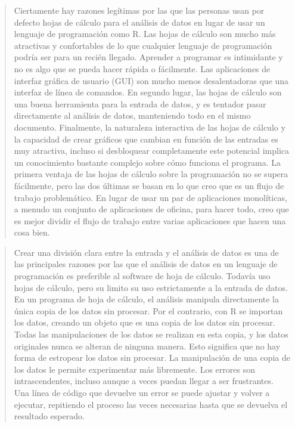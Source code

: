\documentclass[
  letterpaper,
  DIV=11,
  numbers=noendperiod,
  oneside]{scrreprt}
\begin{document}
\begin{quote}
Ciertamente hay razones legítimas por las que las personas usan por
defecto hojas de cálculo para el análisis de datos en lugar de usar un
lenguaje de programación como R. Las hojas de cálculo son mucho más
atractivas y confortables de lo que cualquier lenguaje de programación
podría ser para un recién llegado. Aprender a programar es intimidante y
no es algo que se pueda hacer rápida o fácilmente. Las aplicaciones de
interfaz gráfica de usuario (GUI) son mucho menos desalentadoras que una
interfaz de línea de comandos. En segundo lugar, las hojas de cálculo
son una buena herramienta para la entrada de datos, y es tentador pasar
directamente al análisis de datos, manteniendo todo en el mismo
documento. Finalmente, la naturaleza interactiva de las hojas de cálculo
y la capacidad de crear gráficos que cambian en función de las entradas
es muy atractiva, incluso si desbloquear completamente este potencial
implica un conocimiento bastante complejo sobre cómo funciona el
programa. La primera ventaja de las hojas de cálculo sobre la
programación no se supera fácilmente, pero las dos últimas se basan en
lo que creo que es un flujo de trabajo problemático. En lugar de usar un
par de aplicaciones monolíticas, a menudo un conjunto de aplicaciones de
oficina, para hacer todo, creo que es mejor dividir el flujo de trabajo
entre varias aplicaciones que hacen una cosa bien.
\end{quote}

\begin{quote}
Crear una división clara entre la entrada y el análisis de datos es una
de las principales razones por las que el análisis de datos en un
lenguaje de programación es preferible al software de hoja de cálculo.
Todavía uso hojas de cálculo, pero su limito su uso estrictamente a la
entrada de datos. En un programa de hoja de cálculo, el análisis
manipula directamente la única copia de los datos sin procesar. Por el
contrario, con R se importan los datos, creando un objeto que es una
copia de los datos sin procesar. Todas las manipulaciones de los datos
se realizan en esta copia, y los datos originales nunca se alteran de
ninguna manera. Esto significa que no hay forma de estropear los datos
sin procesar. La manipulación de una copia de los datos le permite
experimentar más libremente. Los errores son intrascendentes, incluso
aunque a veces puedan llegar a ser frustrantes. Una línea de código que
devuelve un error se puede ajustar y volver a ejecutar, repitiendo el
proceso las veces necesarias hasta que se devuelva el resultado
esperado.
\end{quote}
\end{document}
